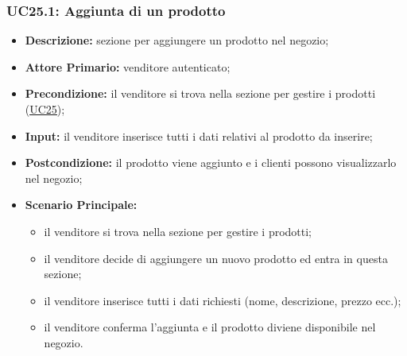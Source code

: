 \subsubsection{UC25.1: Aggiunta di un prodotto}
\label{sec:UC25.1}
\begin{itemize}
    \item \textbf{Descrizione:} sezione per aggiungere un prodotto nel negozio;
    \item \textbf{Attore Primario:} venditore autenticato;
    \item \textbf{Precondizione:} il venditore si trova nella sezione per gestire i prodotti (\hyperref[sec:UC25]{\underline{UC25}});
    \item \textbf{Input:} il venditore inserisce tutti i dati relativi al prodotto da inserire;
    \item \textbf{Postcondizione:} il prodotto viene aggiunto e i clienti possono visualizzarlo nel negozio;
    \item \textbf{Scenario Principale:}
          \begin{itemize}
              \item il venditore si trova nella sezione per gestire i prodotti;
              \item il venditore decide di aggiungere un nuovo prodotto ed entra in questa sezione;
              \item il venditore inserisce tutti i dati richiesti (nome, descrizione, prezzo ecc.);
              \item il venditore conferma l'aggiunta e il prodotto diviene disponibile nel negozio.
          \end{itemize}
\end{itemize}
